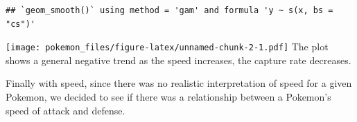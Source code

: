 \documentclass[
]{article}
\newenvironment{Shaded}{\begin{snugshade}}{\end{snugshade}}
\newcommand{\AttributeTok}[1]{\textcolor[rgb]{0.77,0.63,0.00}{#1}}
\newcommand{\CommentTok}[1]{\textcolor[rgb]{0.56,0.35,0.01}{\textit{#1}}}
\newcommand{\DecValTok}[1]{\textcolor[rgb]{0.00,0.00,0.81}{#1}}
\newcommand{\FloatTok}[1]{\textcolor[rgb]{0.00,0.00,0.81}{#1}}
\newcommand{\FunctionTok}[1]{\textcolor[rgb]{0.00,0.00,0.00}{#1}}
\newcommand{\NormalTok}[1]{#1}
\newcommand{\OtherTok}[1]{\textcolor[rgb]{0.56,0.35,0.01}{#1}}
\newcommand{\SpecialCharTok}[1]{\textcolor[rgb]{0.00,0.00,0.00}{#1}}
\newcommand{\StringTok}[1]{\textcolor[rgb]{0.31,0.60,0.02}{#1}}
\begin{document}
\begin{verbatim}
## `geom_smooth()` using method = 'gam' and formula 'y ~ s(x, bs = "cs")'
\end{verbatim}

\texttt{[image: pokemon\_files/figure-latex/unnamed-chunk-2-1.pdf]} The
plot shows a general negative trend as the speed increases, the capture
rate decreases.

Finally with speed, since there was no realistic interpretation of speed
for a given Pokemon, we decided to see if there was a relationship
between a Pokemon's speed of attack and defense.

\begin{Shaded}
\end{Shaded}
\end{document}
